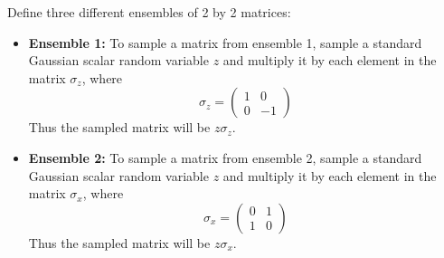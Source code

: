 \documentclass[a4paper]{article}
\begin{document}
Define three different ensembles of 2 by 2 matrices:

\begin{itemize}
    \item \textbf{Ensemble 1:} To sample a matrix from ensemble 1, sample a standard Gaussian scalar random variable $z$ and multiply it by each element in the matrix $\sigma_z$, where 
    \begin{equation}
        \sigma_z = \left( \begin{array}{cc} 1 & 0 \\ 0 & -1 \end{array} \right)
    \end{equation}
    Thus the sampled matrix will be $z \sigma_z$.
    \item \textbf{Ensemble 2:} To sample a matrix from ensemble 2, sample a standard Gaussian  scalar random variable $z$ and multiply it by each element in the matrix $\sigma_x$, where 
    \begin{equation}
        \sigma_x = \left( \begin{array}{cc} 0 & 1 \\ 1 & 0 \end{array} \right)
    \end{equation}
    Thus the sampled matrix will be $z \sigma_x$.
\end{itemize}
\end{document}

